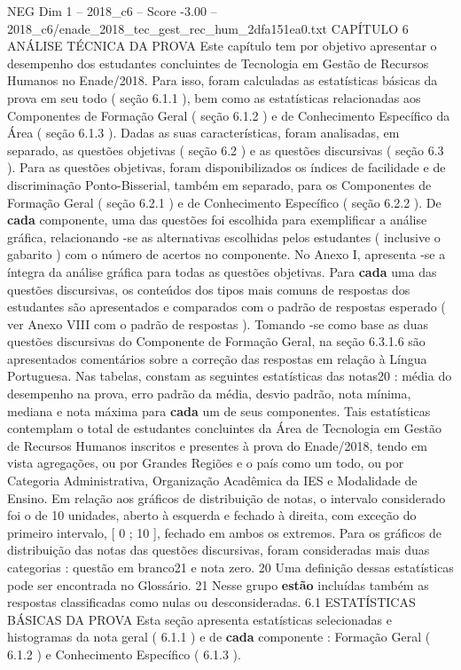\begin{textsample}{NEG Dim 1 – 2018\_c6 – Score -3.00 – 2018\_c6/enade\_2018\_tec\_gest\_rec\_hum\_2dfa151ea0.txt}  \label{ex:f1_neg_197}
CAPÍTULO 6 ANÁLISE TÉCNICA DA PROVA Este capítulo tem por objetivo apresentar o desempenho dos estudantes concluintes de Tecnologia em Gestão de Recursos Humanos no Enade/2018.
Para isso, foram calculadas as estatísticas básicas da prova em seu todo ( seção 6.1.1 ), bem como as estatísticas relacionadas aos Componentes de Formação Geral ( seção 6.1.2 ) e de Conhecimento Específico da Área ( seção 6.1.3 ).
Dadas as suas características, foram analisadas, em separado, as questões objetivas ( seção 6.2 ) e as questões discursivas ( seção 6.3 ).
Para as questões objetivas, foram disponibilizados os índices de facilidade e de discriminação Ponto-Bisserial, também em separado, para os Componentes de Formação Geral ( seção 6.2.1 ) e de Conhecimento Específico ( seção 6.2.2 ).
De \textbf{cada} componente, uma das questões foi escolhida para exemplificar a análise gráfica, relacionando -se as alternativas escolhidas pelos estudantes ( inclusive o gabarito ) com o número de acertos no componente.
No Anexo I, apresenta -se a íntegra da análise gráfica para todas as questões objetivas.
Para \textbf{cada} uma das questões discursivas, os conteúdos dos tipos mais comuns de respostas dos estudantes são apresentados e comparados com o padrão de respostas esperado ( ver Anexo VIII com o padrão de respostas ).
Tomando -se como base as duas questões discursivas do Componente de Formação Geral, na seção 6.3.1.6 são apresentados comentários sobre a correção das respostas em relação à Língua Portuguesa.
Nas tabelas, constam as seguintes estatísticas das notas20 : média do desempenho na prova, erro padrão da média, desvio padrão, nota mínima, mediana e nota máxima para \textbf{cada} um de seus componentes.
Tais estatísticas contemplam o total de estudantes concluintes da Área de Tecnologia em Gestão de Recursos Humanos inscritos e presentes à prova do Enade/2018, tendo em vista agregações, ou por Grandes Regiões e o país como um todo, ou por Categoria Administrativa, Organização Acadêmica da IES e Modalidade de Ensino.
Em relação aos gráficos de distribuição de notas, o intervalo considerado foi o de 10 unidades, aberto à esquerda e fechado à direita, com exceção do primeiro intervalo, [ 0 ; 10 ], fechado em ambos os extremos.
Para os gráficos de distribuição das notas das questões discursivas, foram consideradas mais duas categorias : questão em branco21 e nota zero. 20 Uma definição dessas estatísticas pode ser encontrada no Glossário. 21 Nesse grupo \textbf{estão} incluídas também as respostas classificadas como nulas ou desconsideradas. 6.1 ESTATÍSTICAS BÁSICAS DA PROVA Esta seção apresenta estatísticas selecionadas e histogramas da nota geral ( 6.1.1 ) e de \textbf{cada} componente : Formação Geral ( 6.1.2 ) e Conhecimento Específico ( 6.1.3 ).

\end{textsample}
